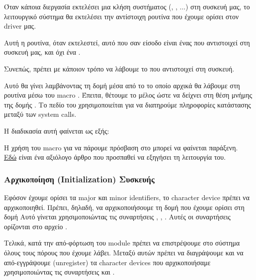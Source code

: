 \documentclass[18pt]{extarticle}
\begin{document}
Όταν κάποια διεργασία εκτελέσει μια κλήση συστήματος (, , ...) στη συσκευή μας, το λειτουργικό σύστημα θα εκτελέσει 
την αντίστοιχη ρουτίνα που έχουμε ορίσει στον driver μας.

Αυτή η ρουτίνα, όταν εκτελεστεί, αυτό που  σαν είσοδο είναι ένας  που αντιστοιχεί στη συσκευή μας, και όχι ένα .

Συνεπώς, πρέπει με κάποιον τρόπο να λάβουμε το  που αντιστοιχεί στη συσκευή.

Αυτό θα γίνει λαμβάνοντας τη δομή  μέσα από το  το οποίο αρχικά θα λάβουμε στη ρουτίνα  μέσω του macro .
Έπειτα, θέτουμε το μέλος  ώστε να δείχνει στη θέση μνήμης της δομής .
Το πεδίο  του  χρησιμοποιείται για να διατηρούμε πληροφορίες κατάστασης μεταξύ των system calls.

Η διαδικασία αυτή φαίνεται ως εξής:

\begin{file}
        
\end{file}

\begin{info}[Σημείωση]
    Η χρήση του macro  για να πάρουμε πρόσβαση στο  μπορεί να φαίνεται παράξενη.
    \href{https://radek.io/2012/11/10/magical-container_of-macro/}{Εδώ} είναι ένα αξιόλογο άρθρο που προσπαθεί να εξηγήσει τη λειτουργία του.
\end{info}

\subsubsection{Αρχικοποίηση (Initialization) Συσκευής}

Εφόσον έχουμε ορίσει τα major και minor identifiers, το character device πρέπει να αρχικοποιηθεί.
Πρέπει, δηλαδή, να αρχικοποιήσουμε τη δομή  που έχουμε ορίσει στη δομή 
Αυτό γίνεται χρησιμοποιώντας τις συναρτήσεις , , .
Αυτές οι συναρτήσεις ορίζονται στο αρχείο .

Τελικά, κατά την από-φόρτωση του module πρέπει να επιστρέψουμε στο σύστημα όλους τους πόρους που έχουμε λάβει. 
Μεταξύ αυτών πρέπει να διαγράψουμε και να από-εγγράψουμε (unregister) τα character devices που αρχικοποιήσαμε 
χρησιμοποιώντας τις συναρτήσεις  και .
\end{document}
